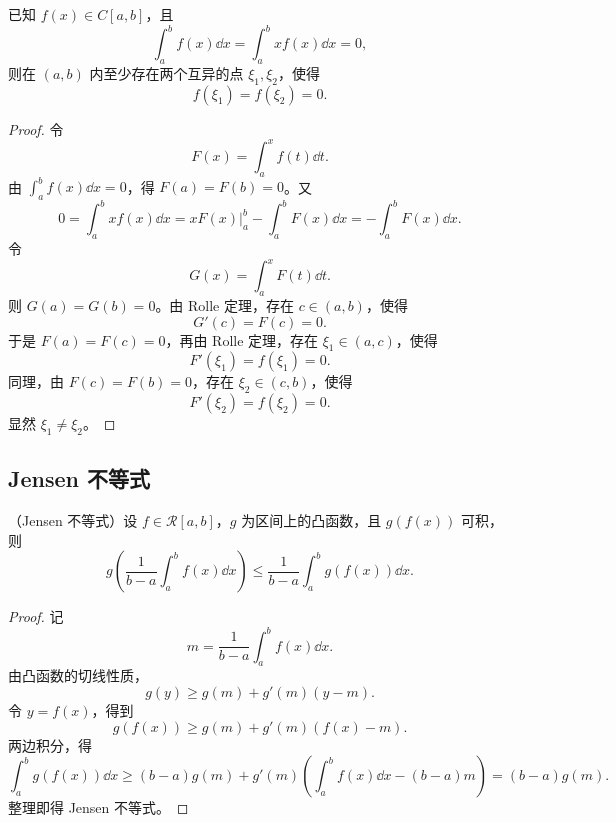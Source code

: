 \begin{problem}
	已知 $f(x)\in C[a,b]$，且
	\[
	\int_a^b f(x)\dd x=\int_a^b x f(x)\dd x=0,
	\]
	则在 $(a,b)$ 内至少存在两个互异的点 $\xi_1,\xi_2$，使得
	\[
	f(\xi_1)=f(\xi_2)=0.
	\]
\end{problem}

\begin{proof}
	令
	\[
	F(x)=\int_a^x f(t)\dd t.
	\]
	由 $\displaystyle\int_a^b f(x)\dd x=0$，得 $F(a)=F(b)=0$。又
	\[
	0=\int_a^b x f(x)\dd x
	=xF(x)\bigg|_a^b-\int_a^b F(x)\dd x
	=-\int_a^b F(x)\dd x.
	\]
	令
	\[
	G(x)=\int_a^x F(t)\dd t.
	\]
	则 $G(a)=G(b)=0$。由 Rolle 定理，存在 $c\in(a,b)$，使得
	\[
	G'(c)=F(c)=0.
	\]
	于是 $F(a)=F(c)=0$，再由 Rolle 定理，存在 $\xi_1\in(a,c)$，使得
	\[
	F'(\xi_1)=f(\xi_1)=0.
	\]
	同理，由 $F(c)=F(b)=0$，存在 $\xi_2\in(c,b)$，使得
	\[
	F'(\xi_2)=f(\xi_2)=0.
	\]
	显然 $\xi_1\neq\xi_2$。
\end{proof}

\subsection*{Jensen 不等式}

\begin{proposition}
	（Jensen 不等式）设 $f\in\mathcal{R}[a,b]$，$g$ 为区间上的凸函数，且 $g(f(x))$ 可积，则
	\[
	g\left(\frac1{b-a}\int_a^b f(x)\dd x\right)
	\leqslant
	\frac1{b-a}\int_a^b g(f(x))\dd x.
	\]
\end{proposition}

\begin{proof}
	记
	\[
	m=\frac1{b-a}\int_a^b f(x)\dd x.
	\]
	由凸函数的切线性质，
	\[
	g(y)\geqslant g(m)+g'(m)(y-m).
	\]
	令 $y=f(x)$，得到
	\[
	g(f(x))\geqslant g(m)+g'(m)(f(x)-m).
	\]
	两边积分，得
	\[
	\int_a^b g(f(x))\dd x
	\geqslant (b-a)g(m)+g'(m)\left(\int_a^b f(x)\dd x-(b-a)m\right)
	=(b-a)g(m).
	\]
	整理即得 Jensen 不等式。
\end{proof}
